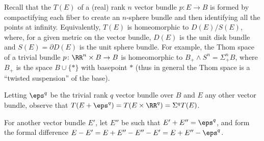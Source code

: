 \documentclass[10pt]{article}
\begin{document}
\begin{example}
    \label{ex:thom-spectra}
    Recall that the  $T(E)$
    of a (real) rank $n$ vector bundle $p\colon E\to B$
    is formed by compactifying each fiber to create an $n$-sphere bundle
    and then identifying all the points at infinity.
    Equivalently, $T(E)$ is homeomorphic to $D(E)/S(E)$,
    where, for a given metric on the vector bundle,
    $D(E)$ is the unit disk bundle and $S(E) = \partial D(E)$
    is the unit sphere bundle.
    For example, the Thom space of a trivial bundle
    $p\colon \RR^n\times B\to B$ is homeomorphic to
    $B_+\wedge S^n = \Sigma^n_+B$, where $B_+$ is the space
    $B\cup\{*\}$ with basepoint $*$
    (thus in general the Thom space is a ``twisted suspension'' of the base).

    Letting $\eps^q$ be the trivial rank $q$ vector bundle over $B$
    and $E$ any other vector bundle,
    observe that $T(E +\eps^q) = T(E\times\RR^q) = \Sigma^q T(E)$.

    For another vector bundle $E'$, let $E''$ be such that
    $E' + E'' = \eps^q$, and form
    the formal difference $E - E' = E + E'' - E'' - E' = E + E'' - \eps^q$.
\end{example}
\end{document}
